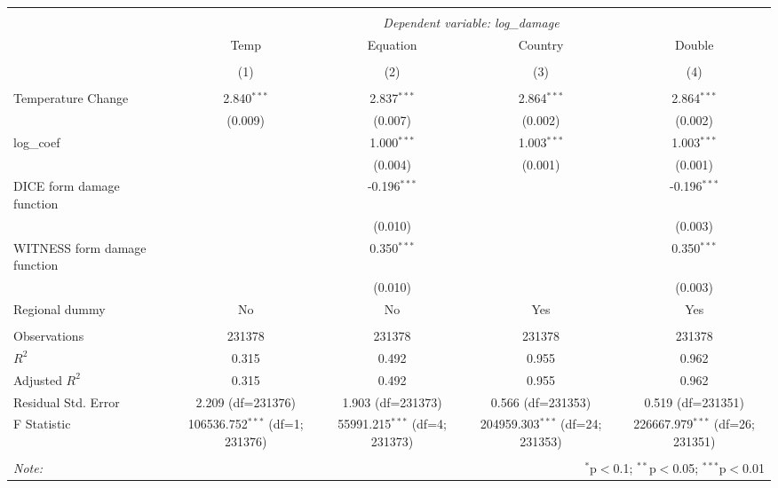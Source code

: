  
\begin{tabular}{@{\extracolsep{5pt}}lcccc}
\\[-1.8ex]\hline
\hline \\[-1.8ex]
& \multicolumn{4}{c}{\textit{Dependent variable: log\_damage}} \
\cr \cline{2-5}
\\[-1.8ex] & \multicolumn{1}{c}{Temp} & \multicolumn{1}{c}{Equation} & \multicolumn{1}{c}{Country} & \multicolumn{1}{c}{Double}  \\
\\[-1.8ex] & (1) & (2) & (3) & (4) \\
\hline \\[-1.8ex]
 Temperature Change & 2.840$^{***}$ & 2.837$^{***}$ & 2.864$^{***}$ & 2.864$^{***}$ \\
& (0.009) & (0.007) & (0.002) & (0.002) \\[2em]
 log\_coef & & 1.000$^{***}$ & 1.003$^{***}$ & 1.003$^{***}$ \\
& & (0.004) & (0.001) & (0.001) \\[2em]
 DICE form damage function & & -0.196$^{***}$ & & -0.196$^{***}$ \\
& & (0.010) & & (0.003) \\[2em]
 WITNESS form damage function & & 0.350$^{***}$ & & 0.350$^{***}$ \\
& & (0.010) & & (0.003) \\[2em]
 Regional dummy & No & No & Yes & Yes \\
\hline \\[-1.8ex]
 Observations & 231378 & 231378 & 231378 & 231378 \\
 $R^2$ & 0.315 & 0.492 & 0.955 & 0.962 \\
 Adjusted $R^2$ & 0.315 & 0.492 & 0.955 & 0.962 \\
 Residual Std. Error & 2.209 (df=231376) & 1.903 (df=231373) & 0.566 (df=231353) & 0.519 (df=231351) \\
 F Statistic & 106536.752$^{***}$ (df=1; 231376) & 55991.215$^{***}$ (df=4; 231373) & 204959.303$^{***}$ (df=24; 231353) & 226667.979$^{***}$ (df=26; 231351) \\
\hline
\hline \\[-1.8ex]
\textit{Note:} & \multicolumn{4}{r}{$^{*}$p$<$0.1; $^{**}$p$<$0.05; $^{***}$p$<$0.01} \\
\end{tabular}
 